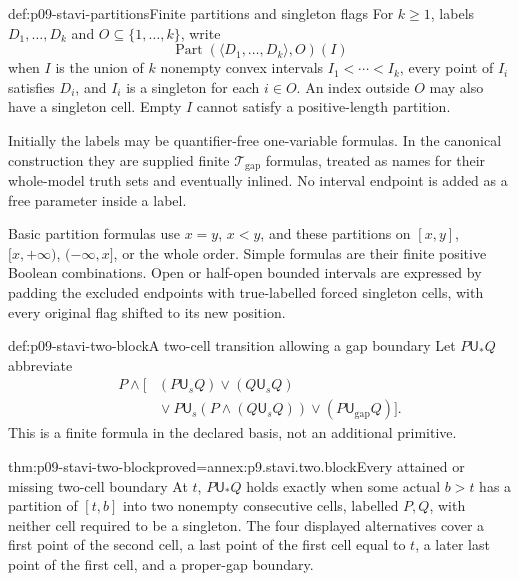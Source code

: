 \begin{hbdefinition}{def:p09-stavi-partitions}{Finite partitions and singleton flags}
For \(k\geq1\), labels \(D_1,\ldots,D_k\)
and \(O\subseteq\{1,\ldots,k\}\), write
\[
                  \operatorname{Part}(\langle D_1,\ldots,D_k\rangle,O)(I)
\]
when \(I\) is the union of \(k\) nonempty
convex intervals \(I_1<\cdots<I_k\), every
point of \(I_i\) satisfies \(D_i\), and
\(I_i\) is a singleton for each \(i\in O\).
An index outside \(O\) may also have a
singleton cell. Empty \(I\) cannot satisfy
a positive-length partition.

Initially the labels may be quantifier-free
one-variable formulas. In the canonical
construction they are supplied finite
\(\mathcal T_{\mathrm{gap}}\) formulas,
treated as names for their whole-model
truth sets and eventually inlined.
No interval endpoint is added as a free
parameter inside a label.

Basic partition formulas use \(x=y\),
\(x<y\), and these partitions on
\([x,y]\), \([x,+\infty)\),
\((-\infty,x]\), or the whole order.
Simple formulas are their finite
positive Boolean combinations.
Open or half-open bounded intervals
are expressed by padding the excluded
endpoints with true-labelled forced
singleton cells, with every original
flag shifted to its new position.
\end{hbdefinition}

\begin{hbdefinition}{def:p09-stavi-two-block}{A two-cell transition allowing a gap boundary}
Let \(P\mathbin{\mathsf U_*}Q\) abbreviate
\[
\begin{split}
 P\land\bigl[
    &(P\mathbin{\mathsf U_s}Q)
     \lor(Q\mathbin{\mathsf U_s}Q)\\
    &{}\lor
       P\mathbin{\mathsf U_s}
                   (P\land(Q\mathbin{\mathsf U_s}Q))
     \lor(P\mathbin{\mathsf U_{\mathrm{gap}}}Q)
                                                        \bigr].
\end{split}
\]
This is a finite formula in the declared
basis, not an additional primitive.
\end{hbdefinition}

\begin{hblemma}{thm:p09-stavi-two-block}{proved=annex:p9.stavi.two.block}{Every attained or missing two-cell boundary}
At \(t\), \(P\mathbin{\mathsf U_*}Q\)
holds exactly when some actual \(b>t\)
has a partition of \([t,b]\) into
two nonempty consecutive cells, labelled
\(P,Q\), with neither cell required
to be a singleton.
The four displayed alternatives cover
a first point of the second cell,
a last point of the first cell equal
to \(t\), a later last point of the
first cell, and a proper-gap boundary.
\end{hblemma}

